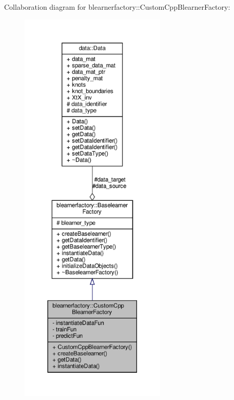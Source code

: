 Collaboration diagram for blearnerfactory\+:\+:Custom\+Cpp\+Blearner\+Factory\+:\nopagebreak
\begin{figure}[H]
\begin{center}
\leavevmode
\includegraphics[height=550pt]{classblearnerfactory_1_1_custom_cpp_blearner_factory__coll__graph}
\end{center}
\end{figure}
